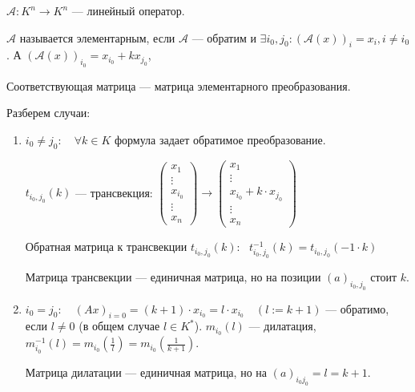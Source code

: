 \begin{definition}
    $\mathcal{A}\!: K^n \to K^n$ --- линейный оператор.

    $\mathcal{A}$ называется элементарным, если  $\mathcal{A}$ --- обратим и $\exists i_0, j_0\!: (\mathcal{A}(x))_i = x_i, i \neq i_0$. А $(\mathcal{A}(x))_{i_0} = x_{i_0} + kx_{j_0}$,

    Соответствующая матрица --- матрица элементарного преобразования.
\end{definition}


Разберем случаи:
\begin{enumerate}
    \item $i_0 \neq j_0: \quad \forall k \in K$ формула задает обратимое преобразование.

    $t_{i_0, j_0}(k)$ --- трансвекция: $\begin{pmatrix} x_1 \\ \vdots \\ x_{i_0} \\ \vdots  \\ x_n \end{pmatrix} \to \begin{pmatrix} x_1 \\ \vdots \\ x_{i_0} + k \cdot x_{j_0} \\ \vdots  \\ x_n \end{pmatrix}$

    Обратная матрица к трансвекции $t_{i_0, j_0}(k)$: \ $t^{-1}_{i_0, j_0}(k) = t_{i_0, j_0}(-1 \cdot k)$

    Матрица трансвекции --- единичная матрица, но на позиции $(a)_{i_0, j_0}$ стоит $k$.

    \item $i_0 = j_0: \quad (Ax)_{i=0} = (k+1) \cdot x_{i_0} = l \cdot x_{i_0} \quad (l := k+1)$ --- обратимо, если $l \neq 0$ (в общем случае $l \in K^*$). $m_{i_0}(l)$ --- дилатация, $m_{i_0}^{-1}(l) = m_{i_0}(\frac{1}{l})=m_{i_0}(\frac{1}{k+1})$.

    Матрица дилатации --- единичная матрица, но на $(a)_{i_0 j_0} = l = k + 1$.
\end{enumerate}



